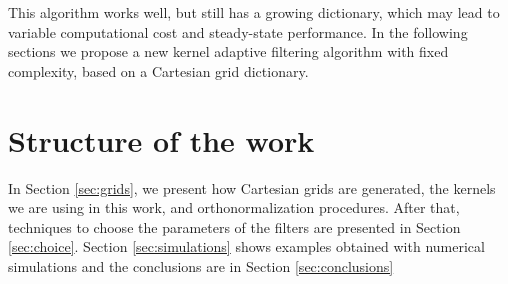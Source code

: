 This algorithm works well, but still has a growing dictionary, which may lead to variable computational cost and steady-state performance.
In the following sections we propose a new kernel adaptive filtering algorithm with fixed complexity, based on a Cartesian grid dictionary.

\section{Structure of the work}
In Section \ref{sec:grids}, we present how Cartesian grids are generated, the kernels we are using in this work, and orthonormalization procedures. After that, techniques to
choose the parameters of the filters are presented in Section \ref{sec:choice}. Section \ref{sec:simulations} shows examples obtained with numerical simulations and the conclusions
are in Section \ref{sec:conclusions}
